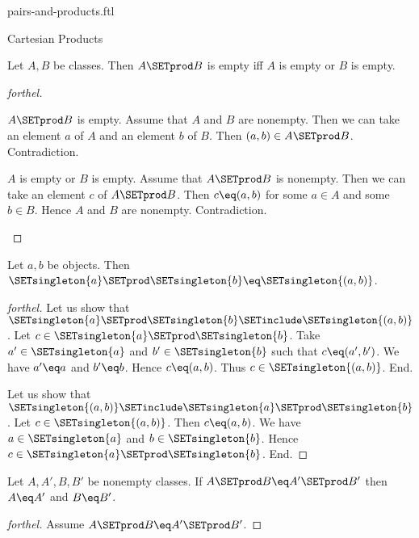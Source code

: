 \documentclass{naproche-library}
\begin{document}
\begin{smodule}[title=Ordered Pairs and Cartesian Products]{pairs-and-products.ftl}
\begin{sfragment}{Cartesian Products}
  \begin{proposition}[forthel,id=FOUNDATIONS_04_2198552029691904]
    Let $A, B$ be classes.
    Then $A \SETprod B$ is empty iff $A$ is empty or $B$ is empty.
  \end{proposition}
  \begin{proof}[forthel]
    \begin{case}{$A \SETprod B$ is empty.}
      Assume that $A$ and $B$ are nonempty.
      Then we can take an element $a$ of $A$ and an element $b$ of $B$.
      Then $(a, b) \in A \SETprod B$.
      Contradiction.
    \end{case}

    \begin{case}{$A$ is empty or $B$ is empty.}
      Assume that $A \SETprod B$ is nonempty.
      Then we can take an element $c$ of $A \SETprod B$.
      Then $c \eq (a, b)$ for some $a \in A$ and some $b \in B$.
      Hence $A$ and $B$ are nonempty.
      Contradiction.
    \end{case}
  \end{proof}

  \begin{proposition}[forthel,id=FOUNDATIONS_04_7971087096741888]
    Let $a, b$ be objects.
    Then $\SETsingleton{a} \SETprod \SETsingleton{b} \eq \SETsingleton{(a, b)}$.
  \end{proposition}
  \begin{proof}[forthel]
    Let us show that $\SETsingleton{a} \SETprod \SETsingleton{b} \SETinclude \SETsingleton{(a, b)}$.
      Let $c \in \SETsingleton{a} \SETprod \SETsingleton{b}$.
      Take $a' \in \SETsingleton{a}$ and $b' \in \SETsingleton{b}$ such that $c \eq (a', b')$.
      We have $a' \eq a$ and $b' \eq b$.
      Hence $c \eq (a, b)$.
      Thus $c \in \SETsingleton{(a, b)}$.
    End.

    Let us show that $\SETsingleton{(a, b)} \SETinclude \SETsingleton{a} \SETprod \SETsingleton{b}$.
      Let $c \in \SETsingleton{(a, b)}$.
      Then $c \eq (a, b)$.
      We have $a \in \SETsingleton{a}$ and $b \in \SETsingleton{b}$.
      Hence $c \in \SETsingleton{a} \SETprod \SETsingleton{b}$.
    End.
  \end{proof}

  \begin{proposition}[forthel,id=FOUNDATIONS_04_7456594440749056]
    Let $A, A', B, B'$ be nonempty classes.
    If $A \SETprod B \eq A' \SETprod B'$ then $A \eq A'$ and $B \eq B'$.
  \end{proposition}
  \begin{proof}[forthel]
    Assume $A \SETprod B \eq A' \SETprod B'$.


\end{proof}
\end{sfragment}
\end{smodule}
\end{document}
